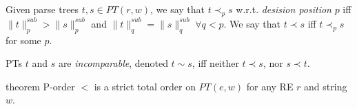 \documentclass[AMA,STIX1COL]{WileyNJD-v2}
\newcommand{\snorm}[2]{\|{#1}\|^{sub}_{#2}}
\begin{document}
    \begin{definition}
    \label{partial_order_on_PTs}
    Given parse trees $t, s \in PT(r, w)$, we say that $t \prec_p s$ w.r.t. \emph{desision position} $p$ %
    iff $\snorm{t}{p} > \snorm{s}{p}$ and $\snorm{t}{q} = \snorm{s}{q} \; \forall q < p$.
    We say that $t \prec s$ iff $t \prec_p s$ for some $p$.
    \end{definition}

    \begin{definition}\label{incomparable_PTs}
    PTs $t$ and $s$ are \emph{incomparable}, denoted $t \sim s$,
    iff neither $t \prec s$, nor $s \prec t$.
    \end{definition}

\begin{theoremEnd}[restate, no link to proof, no link to theorem, category=theorem_porder_on_PTs]{theorem}
    \label{theorem_porder_on_PTs}
    P-order $<$ is a strict total order on $PT(e, w)$ for any RE $r$ and string $w$.
\end{theoremEnd}
\end{document}

